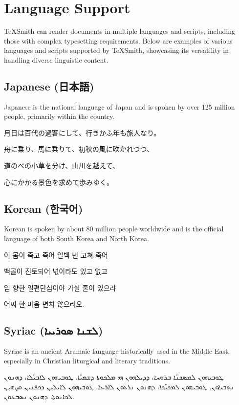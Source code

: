 \documentclass{article}
\begin{document}
\tableofcontents

\section{Language Support}\label{language-support}

TeXSmith can render documents in multiple languages and scripts, including those with complex typesetting requirements. Below are examples of various
languages and scripts supported by TeXSmith, showcasing its versatility in
handling diverse linguistic content.

\subsection{Japanese ({\japanesefont 日本語})}\label{japanese}

Japanese is the national language of Japan and is spoken by over 125 million people, primarily within the country.

月日は百代の過客にして、行きかふ年も旅人なり。

舟に乗り、馬に乗りて、初秋の風に吹かれつつ、

道のべの小草を分け、山川を越えて、

心にかかる景色を求めて歩みゆく。

\subsection{Korean ({\koreanfont 한국어})}\label{korean}

Korean is spoken by about 80 million people worldwide and is the official language of both South Korea and North Korea.

이 몸이 죽고 죽어 일백 번 고쳐 죽어

백골이 진토되어 넋이라도 있고 없고

임 향한 일편단심이야 가실 줄이 있으랴

어찌 한 마음 변치 않으리오.

\subsection{Syriac ({\syriacFullfont ܠܫܢܐ ܣܘܪܝܝܐ})}\label{syriac}

Syriac is an ancient Aramaic language historically used in the Middle East, especially in Christian liturgical and literary traditions.

ܛܘܒܝܗܘܢ ܠܡܣܟܢ̈ܐ ܒܪܘܚܐ، ܕܕܝܠܗܘܢ ܗܝ ܡܠܟܘܬܐ ܕܫܡܝ̈ܐ. ܛܘܒܝܗܘܢ ܠܐܒܝ̈ܠܐ، ܕܗܢܘܢ ܢܬܒܝܐܘܢ. ܛܘܒܝܗܘܢ ܠܡܟܝ̈ܟܐ، ܕܗܢܘܢ ܢܪܬܘܢ ܠܐܪܥܐ. ܛܘܒܝܗܘܢ ܠܐܝܠܝܢ ܕܟܦܢܝܢ ܘܨܗܝܢ ܠܟܐܢܘܬܐ، ܕܗܢܘܢ ܢܣܒܥܘܢ.
\end{document}
